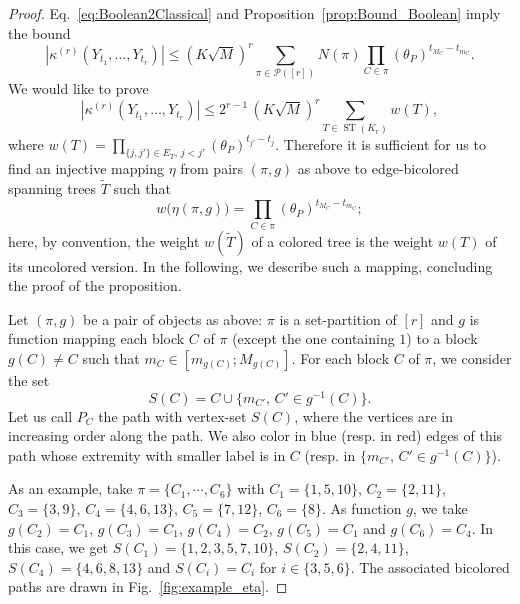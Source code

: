 \documentclass[envcountsame]{svmult}
\def\PPP{\mathcal{P}}
\DeclareMathOperator{\ST}{ST}
\begin{document}
\begin{proof}
 
 Eq.~\eqref{eq:Boolean2Classical} and Proposition~\ref{prop:Bound_Boolean} imply the bound
 \begin{equation*}
   \left|\kappa^{(r)}(Y_{t_1},\ldots,Y_{t_r}) \right| \leq \left(K\sqrt{M}\right)^r
   \sum_{\pi \in \PPP([r])} 
   N(\pi) \prod_{C \in \pi} (\theta_P)^{t_{M_C}-t_{m_C}}.
 \end{equation*}
 We would like to prove 
\begin{equation*}
   \left|\kappa^{(r)}(Y_{t_1},\ldots,Y_{t_r}) \right| \leq 2^{r-1}\,\left(K\sqrt{M}\right)^r
   \sum_{T \in \ST(K_r)} w(T),
\end{equation*}
where $w(T)=\prod_{ \{j,j'\} \in E_T, \, j<j'} (\theta_P)^{t_{j'}-t_j}$.
Therefore it is sufficient for us to find an injective mapping $\eta$ from pairs $(\pi,g)$ as above
to edge-bicolored spanning trees $\widetilde{T}$ such that
\begin{equation}
  w\big( \eta(\pi,g) \big) =  \prod_{C \in \pi} (\theta_P)^{t_{M_C}-t_{m_C}}; 
  \label{eq:eta_Conserve_Poids}
\end{equation}
here, by convention, the weight $w(\widetilde{T})$ of a colored tree 
is the weight $w(T)$ of its uncolored version.
In the following, we describe such a mapping, concluding the proof of the proposition.
\bigskip

Let $(\pi,g)$ be a pair of objects as above:
$\pi$ is a set-partition of $[r]$ and $g$ is function mapping 
each block $C$ of $\pi$ (except the one containing $1$) to a block $g(C) \ne C$  
such that $m_C \in [m_{g(C)};M_{g(C)}]$.
For each block $C$ of $\pi$, we consider the set 
$$S(C)=C \cup \{m_{C'},\, C' \in g^{-1}(C)\}.$$
Let us call $P_C$ the path with vertex-set $S(C)$,
where the vertices are in increasing order along the path.
We also color in blue (resp. in red) edges of this path whose extremity with smaller
label is in $C$ (resp. in $\{m_{C'},\, C' \in g^{-1}(C)\}$).
\medskip

As an example, take $\pi=\{C_1,\cdots,C_6\}$ with $C_1=\{1,5,10\}$,
$C_2=\{2,11\}$, $C_3=\{3,9\}$, $C_4=\{4,6,13\}$, $C_5=\{7,12\}$, $C_6=\{8\}$.
As function $g$, we take $g(C_2)=C_1$, $g(C_3)=C_1$, $g(C_4)=C_2$, $g(C_5)=C_1$
and $g(C_6)=C_4$.
In this case, we get $S(C_1)=\{1,2,3,5,7,10\}$, $S(C_2)=\{2,4,11\}$,
$S(C_4)=\{4,6,8,13\}$ and $S(C_i)=C_i$ for $i \in \{3,5,6\}$.
The associated bicolored paths are drawn in Fig.~\ref{fig:example_eta}.\bigskip



\end{proof}
\end{document}
